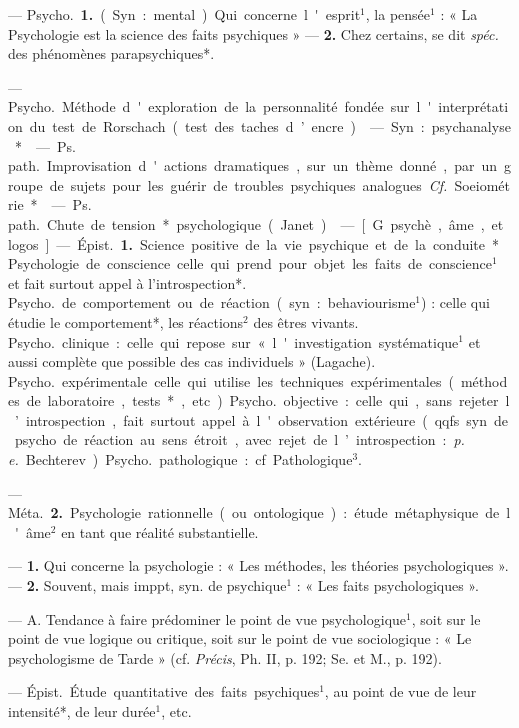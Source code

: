 \begin{itemize}[leftmargin=1cm, label=, itemsep=1pt]
 — \si{Psycho.} {\bf 1.} (Syn. : mental). Qui concerne l'esprit$^1$, la
pensée$^1$ : « La Psychologie est la
science des faits psychiques » —
 {\bf 2.} Chez certains, se dit {\it spéc.} des
phénomènes parapsychiques*.

 — \si{Psycho.} Méthode
d'exploration de la personnalité
fondée sur l'interprétation du test de
Rorschach (test des taches d’encre).

 — Syn. : psychanalyse*.

 — \si{Ps. path.} Improvisation d'actions dramatiques, sur
un thème donné, par un groupe de
sujets pour les guérir de troubles
psychiques analogues. {\it Cf.} Soeiométrie*.

 — \si{Ps. path.} Chute de
tension* psychologique (Janet).

 — [G. psychè, âme, et logos]
— \si{Épist.} {\bf 1.} Science positive de la vie
psychique et de la conduite*. Psychologie de conscience celle qui
prend pour objet les faits de conscience$^1$ et fait surtout appel à l’introspection*. \si{Psycho.} de comportement ou de réaction (syn. : behaviourisme$^1$) : celle qui étudie le comportement*,
les réactions$^2$ des êtres
vivants. \si{Psycho.} clinique : celle qui
repose sur « l'investigation systématique$^1$ et aussi complète que possible des cas individuels » (Lagache).
\si{Psycho.} expérimentale celle qui
utilise les techniques expérimentales (méthodes de laboratoire,
tests*, etc.). \si{Psycho.} objective : celle
qui, sans rejeter l’introspection, fait
surtout appel à l'observation extérieure (qqfs. syn. de psycho. de réaction au sens étroit, avec rejet de l’introspection : {\it p. e.} Bechterev). \si{Psycho.}
pathologique : cf. Pathologique$^3$.

— \si{Méta.} {\bf 2.} Psychologie rationnelle (ou ontologique) : étude métaphysique de l'âme$^2$ en tant que
réalité substantielle.

 — {\bf 1.} Qui concerne la
psychologie : « Les méthodes, les
théories psychologiques ». — {\bf 2.} Souvent, mais imppt, syn. de psychique$^1$ :
« Les faits psychologiques ».

 — A. Tendance à faire
prédominer le point de vue psychologique$^1$, soit sur le point de vue
logique ou critique, soit sur le point
de vue sociologique : « Le psychologisme de Tarde » (cf. {\it Précis}, Ph. II,
p. 192; Se. et M., p. 192).

 — \si{Épist.} Étude quantitative des faits psychiques$^1$, au
point de vue de leur intensité*, de
leur durée$^1$, etc.


\end{itemize}
